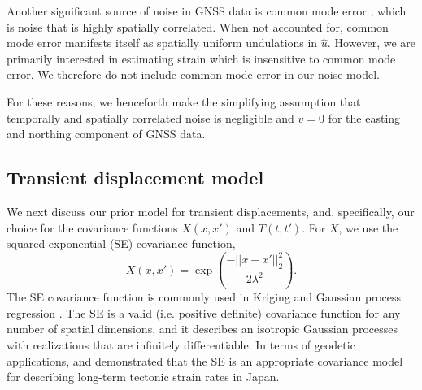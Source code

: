 \documentclass[10pt,a4paper]{article}
\begin{document}
Another significant source of noise in GNSS data is common mode error \citep[e.g.,][]{Wdowinski1997,Dong2006}, which is noise that is highly spatially correlated. When not accounted for, common mode error manifests itself as spatially uniform undulations in $\hat{u}$. However, we are primarily interested in estimating strain which is insensitive to common mode error. We therefore do not include common mode error in our noise model. 

For these reasons, we henceforth make the simplifying assumption that temporally and spatially correlated noise is negligible and $v = 0$ for the easting and northing component of GNSS data.            

\subsection{Transient displacement model}\label{sec:SignalModel}
We next discuss our prior model for transient displacements, and, specifically, our choice for the covariance functions $X(x,x')$ and $T(t,t')$. For $X$, we use the squared exponential (SE) covariance function,
\begin{equation}\label{eq:SE}
X(x,x') = \exp\left(\frac{-||x - x'||_2^2}{2 \lambda^2}\right).
\end{equation}
The SE covariance function is commonly used in Kriging \citep[e.g,][]{Cressie1992} and Gaussian process regression \citep[e.g.,][]{Rasmussen2006}.  The SE is a valid (i.e. positive definite) covariance function for any number of spatial dimensions, and it describes an isotropic Gaussian processes with realizations that are infinitely differentiable. In terms of geodetic applications, \citet{Kato1998} and \cite{El-Fiky1999} demonstrated that the SE is an appropriate covariance model for describing long-term tectonic strain rates in Japan.  
\end{document}
